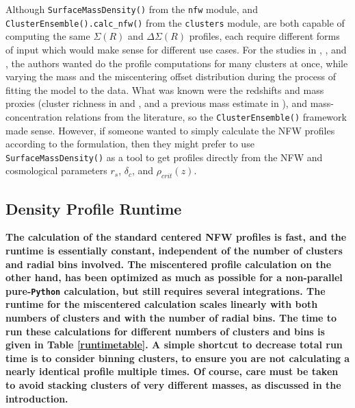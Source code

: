 \documentclass[twocolumn]{aastex6}
\newcommand{\code}{\lstinline[style=codeintext]}
\begin{document}
Although \code{SurfaceMassDensity()} from the \code{nfw} module, and \code{ClusterEnsemble().calc_nfw()} from the \code{clusters} module, are both capable of computing the same $\Sigma(R)$ and $\Delta\Sigma(R)$ profiles, each require different forms of input which would make sense for different use cases. For the studies in \citet{Ford15}, \citet{Ford14}, and \citet{Ford12}, the authors wanted do the profile computations for many clusters at once, while varying the mass and the miscentering offset distribution during the process of fitting the model to the data. What was known were the redshifts and mass proxies (cluster richness in \citealt{Ford15} and \citealt{Ford14}, and a previous mass estimate in \citealt{Ford12}), and mass-concentration relations from the literature, so the \code{ClusterEnsemble()} framework made sense. However, if someone wanted to simply calculate the NFW profiles according to the \citet{Wright00} formulation, then they might prefer to use \code{SurfaceMassDensity()} as a tool to get profiles directly from the NFW and cosmological parameters $r_s$, $\delta_c$, and $\rho_{crit}(z)$.


\subsection{Density Profile Runtime}
\label{time}
\textbf{The calculation of the standard centered NFW profiles is fast, and the runtime is essentially constant, independent of the number of clusters and radial bins involved. The miscentered profile calculation on the other hand, has been optimized as much as possible for a non-parallel pure-\code{Python} calculation, but still requires several integrations. The runtime for the miscentered calculation scales linearly with both numbers of clusters and with the number of radial bins. The time to run these calculations for different numbers of clusters and bins is given in Table \ref{runtimetable}. A simple shortcut to decrease total run time is to consider binning clusters, to ensure you are not calculating a nearly identical profile multiple times. Of course, care must be taken to avoid stacking clusters of very different masses, as discussed in the introduction.}
\end{document}
